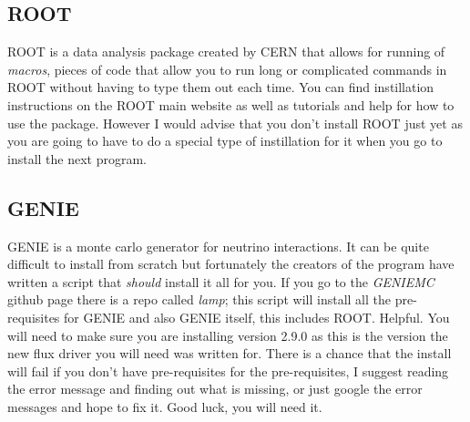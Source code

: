\documentclass[12pt]{article}
\numberwithin{equation}{section}
\numberwithin{figure}{section}
\begin{document}
\subsection{ROOT} %
\label{sub:root}
ROOT is a data analysis package created by CERN that allows for running of \emph{macros}, pieces of code that allow you to run long or complicated commands in ROOT without having to type them out each time. You can find instillation instructions on the ROOT main website as well as tutorials and help for how to use the package. However I would advise that you don't install ROOT just yet as you are going to have to do a special type of instillation for it when you go to install the next program.
%
\subsection{GENIE} %
\label{sub:genie}
GENIE is a monte carlo generator for neutrino interactions. It can be quite difficult to install from scratch but fortunately the creators of the program have written a script that \emph{should} install it all for you. If you go to the \emph{GENIEMC} github page there is a repo called \emph{lamp}; this script will install all the pre-requisites for GENIE and also GENIE itself, this includes ROOT. Helpful. You will need to make sure you are installing version 2.9.0 as this is the version the new flux driver you will need was written for. There is a chance that the install will fail if you don't have pre-requisites for the pre-requisites, I suggest reading the error message and finding out what is missing, or just google the error messages and hope to fix it. Good luck, you will need it.
%
\end{document}
